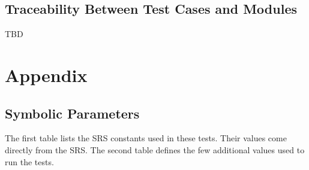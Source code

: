 \documentclass[10pt,titlepage]{article}
\begin{document}


					
					
					
					
					

					
					
					
					




\subsection{Traceability Between Test Cases and Modules}

TBD


\newpage

\section{Appendix}

\subsection{Symbolic Parameters}\label{sec:VnVParameters}

The first table lists the SRS constants used in these tests. Their values
come directly from the SRS. The second
table defines the few additional values used to run the tests.
\end{document}
